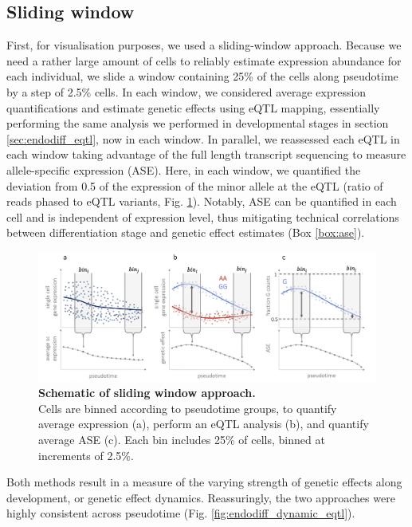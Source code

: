 \subsection{Sliding window}

First, for visualisation purposes, we used a sliding-window approach. 
Because we need a rather large amount of cells to reliably estimate expression abundance for each individual, we slide a window containing 25\% of the cells along pseudotime by a step of 2.5\% cells.
In each window, we considered average expression quantifications and estimate genetic effects using eQTL mapping, essentially performing the same analysis we performed in developmental stages in section \ref{sec:endodiff_eqtl}, now in each window.
In parallel, we reassessed each eQTL in each window taking advantage of the full length transcript sequencing to measure allele-specific expression (ASE).
Here, in each window, we quantified the deviation from 0.5 of the expression of the minor allele at the eQTL (ratio of reads phased to eQTL variants, Fig. \ref{fig:endodiff_sliding_window}). 
Notably, ASE can be quantified in each cell and is independent of expression level, thus mitigating technical correlations between differentiation stage and genetic effect estimates (Box \ref{box:ase}). 

\begin{figure}[h]
\centering
\includegraphics[width=15.5cm]{Chapter4/Fig/endodiff_running_average.png}
\caption[Schematic of sliding window approach]{\textbf{Schematic of sliding window approach.}\\
Cells are binned according to pseudotime groups, to quantify average expression (a), perform an eQTL analysis (b), and quantify average ASE (c).
Each bin includes 25\% of cells, binned at increments of 2.5\%.}
\label{fig:endodiff_sliding_window}
\end{figure}


Both methods result in a measure of the varying strength of genetic effects along development, or genetic effect dynamics. 
Reassuringly, the two approaches were highly consistent across pseudotime (Fig. \ref{fig:endodiff_dynamic_eqtl}).


